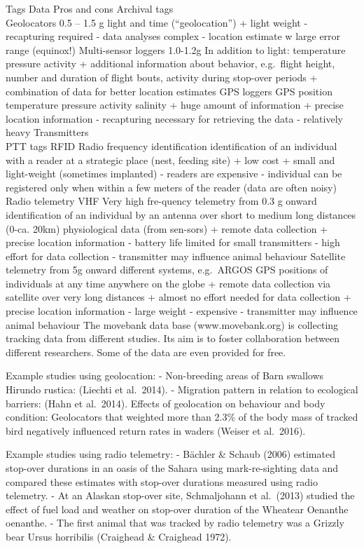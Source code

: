 \documentclass[
]{book}
\begin{document}
Tags Data Pros and cons
Archival tags\\
Geolocators
0.5 -- 1.5 g light and time (``geolocation'')
+ light weight
- recapturing required
- data analyses complex
- location estimate w large error range (equinox!)
Multi-sensor loggers
1.0-1.2g
In addition to light:
temperature
pressure
activity
+ additional information about behavior, e.g.~flight height, number and duration of flight bouts, activity during stop-over periods
+ combination of data for better location estimates
GPS loggers GPS position
temperature
pressure
activity
salinity + huge amount of information
+ precise location information
- recapturing necessary for retrieving the data
- relatively heavy
Transmitters\\
PTT tags
RFID Radio frequency identification identification of an individual with a reader at a strategic place (nest, feeding site) + low cost
+ small and light-weight (sometimes implanted)
- readers are expensive
- individual can be registered only when within a few meters of the reader (data are often noisy)
Radio telemetry
VHF Very high fre-quency telemetry
from 0.3 g onward identification of an individual by an antenna over short to medium long distances (0-ca. 20km)
physiological data (from sen-sors) + remote data collection
+ precise location information
- battery life limited for small transmitters
- high effort for data collection
- transmitter may influence animal behaviour
Satellite telemetry
from 5g onward
different systems, e.g.~ARGOS
GPS positions of individuals at any time anywhere on the globe + remote data collection via satellite over very long distances
+ almost no effort needed for data collection
+ precise location information
- large weight
- expensive
- transmitter may influence animal behaviour
The movebank data base (www.movebank.org) is collecting tracking data from different studies. Its aim is to foster collaboration between different researchers. Some of the data are even provided for free.

Example studies using geolocation:
- Non-breeding areas of Barn swallows Hirundo rustica: (Liechti et al.~2014).
- Migration pattern in relation to ecological barriers: (Hahn et al.~2014).
Effects of geolocation on behaviour and body condition: Geolocators that weighted more than 2.3\% of the body mass of tracked bird negatively influenced return rates in waders (Weiser et al.~2016).

Example studies using radio telemetry:
- Bächler \& Schaub (2006) estimated stop-over durations in an oasis of the Sahara using mark-re-sighting data and compared these estimates with stop-over durations measured using radio telemetry.
- At an Alaskan stop-over site, Schmaljohann et al.~(2013) studied the effect of fuel load and weather on stop-over duration of the Wheatear Oenanthe oenanthe.
- The first animal that was tracked by radio telemetry was a Grizzly bear Ursus horribilis (Craighead \& Craighead 1972).
\end{document}

